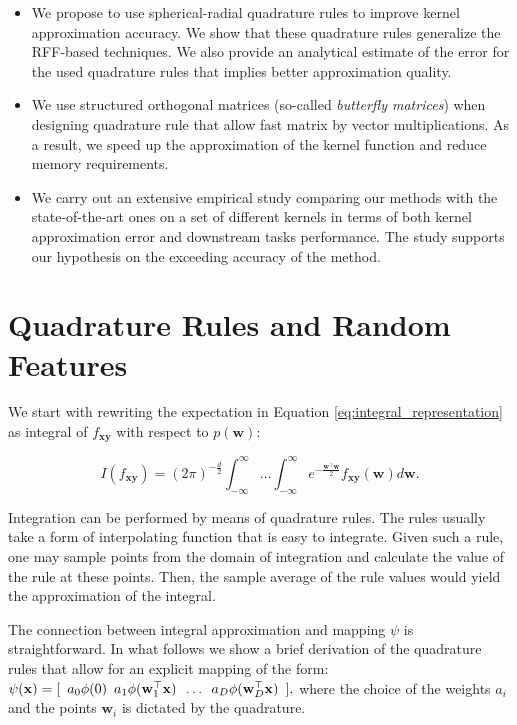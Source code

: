 \begin{itemize}
\item We propose to use spherical-radial quadrature rules to improve kernel approximation accuracy. We show that these quadrature rules generalize the RFF-based techniques. We also provide an analytical estimate of the error for the used quadrature rules that implies better approximation quality.
\item
We use structured orthogonal matrices (so-called \emph{butterfly matrices}) when designing quadrature rule that allow fast matrix by vector multiplications. As a result, we speed up the approximation of the kernel function and reduce memory requirements.
\item
We carry out an extensive empirical study comparing our methods with the state-of-the-art ones on a set of different kernels in terms of both kernel approximation error and downstream tasks performance. The study supports our hypothesis on the exceeding accuracy of the method.
\end{itemize}

\section{Quadrature Rules and Random Features}
\label{sec:quadrature_rule}
We start with rewriting the expectation in Equation \eqref{eq:integral_representation} as integral of $f_{\mathbf{xy}}$ with respect to $p(\mathbf{w})$:

\begin{equation*}
I(f_{\mathbf{xy}}) = (2\pi)^{-\frac{d}{2}} \int_{-\infty}^{\infty} \dots  \int_{-\infty}^{\infty} e^{-\frac{\mathbf{w}^{\boldsymbol{\top}}\mathbf{w}}{2}} f_{\mathbf{xy}}(\mathbf{w})d\mathbf{w}.
\end{equation*}

Integration can be performed by means of quadrature rules. The rules usually take a form of interpolating function that is easy to integrate. Given such a rule, one may sample points from the domain of integration and calculate the value of the rule at these points. Then, the sample average of the rule values would yield the approximation of the integral.

The connection between integral approximation and mapping $\psi$ is straightforward. In what follows we show a brief derivation of the quadrature rules that allow for an explicit mapping of the form: ${
	\psi(\mathbf{x}) = [\enskip a_0 \phi(0) \enskip
	a_1 \phi(\mathbf{w}_1^{\top} \mathbf{x})
	\enskip \dots \enskip
	a_D \phi(\mathbf{w}_{D}^\top \mathbf{x}) \enskip],}
$
where the choice of the weights $a_i$ and the points $\mathbf{w}_i$ is dictated by the quadrature.


